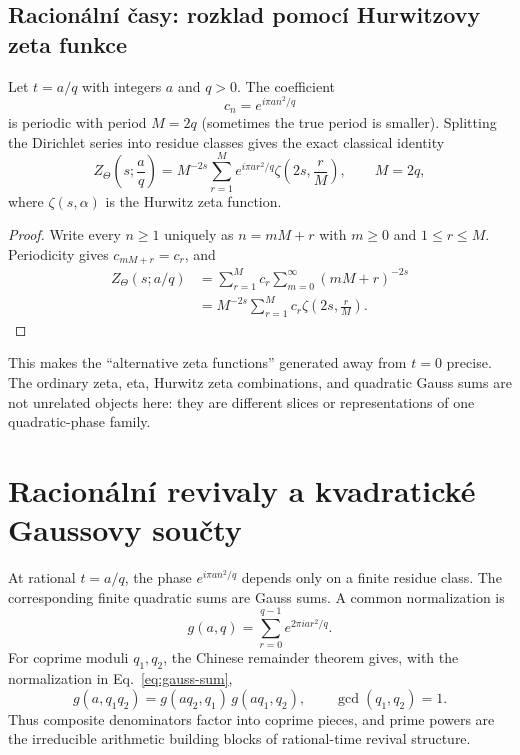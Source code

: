 \subsection{Racionální časy: rozklad pomocí Hurwitzovy zeta funkce}

Let $t=a/q$ with integers $a$ and $q>0$.  The coefficient
\begin{equation}
 c_n=e^{i\pi a n^2/q}
\end{equation}
is periodic with period $M=2q$ (sometimes the true period is smaller).  Splitting the
Dirichlet series into residue classes gives the exact classical identity
\begin{equation}
 \boxed{
 Z_\Theta\!\left(s;\frac aq\right)
 =M^{-2s}\sum_{r=1}^{M}
 e^{i\pi a r^2/q}
 \zeta\!\left(2s,\frac rM\right),
 \qquad M=2q,}
 \label{eq:rational-hurwitz}
\end{equation}
where $\zeta(s,\alpha)$ is the Hurwitz zeta function.

\begin{proof}
Write every $n\ge1$ uniquely as $n=mM+r$ with $m\ge0$ and $1\le r\le M$.
Periodicity gives $c_{mM+r}=c_r$, and
\begin{align*}
 Z_\Theta(s;a/q)
 &=\sum_{r=1}^{M}c_r\sum_{m=0}^{\infty}(mM+r)^{-2s}\\
 &=M^{-2s}\sum_{r=1}^{M}c_r
   \zeta\!\left(2s,\frac rM\right).
\end{align*}
\end{proof}

This makes the ``alternative zeta functions'' generated away from $t=0$ precise.  The
ordinary zeta, eta, Hurwitz zeta combinations, and quadratic Gauss sums are not unrelated
objects here: they are different slices or representations of one quadratic-phase family.

\section{Racionální revivaly a kvadratické Gaussovy součty}
\label{sec:gauss-revivals}

At rational $t=a/q$, the phase $e^{i\pi a n^2/q}$ depends only on a finite residue class.
The corresponding finite quadratic sums are Gauss sums.  A common normalization is
\begin{equation}
 g(a,q)=\sum_{r=0}^{q-1}e^{2\pi i a r^2/q}.
 \label{eq:gauss-sum}
\end{equation}
For coprime moduli $q_1,q_2$, the Chinese remainder theorem gives, with the
normalization in Eq.~\eqref{eq:gauss-sum},
\begin{equation}
 g(a,q_1q_2)=g(aq_2,q_1)\,g(aq_1,q_2),
 \qquad \gcd(q_1,q_2)=1.
 \label{eq:gauss-crt}
\end{equation}
Thus composite denominators factor into coprime pieces, and prime powers are the
irreducible arithmetic building blocks of rational-time revival structure.

